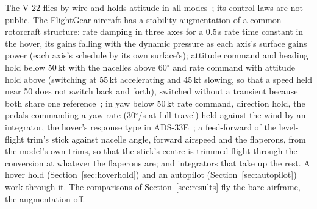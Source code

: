 \documentclass[10pt,a4paper,twocolumn]{article}
\begin{document}
The V-22 flies by wire and holds attitude in all modes~\cite{pd}; its control laws are not public. The FlightGear aircraft has a
stability augmentation of a common rotorcraft structure: rate damping in three axes for a 0.5\,s rate time constant in the hover,
its gains falling with the dynamic pressure as each axis's surface gains power (each axis's schedule by its own surface's);
attitude command and heading hold below 50\,kt with the nacelles above 60$^\circ$ and rate command with attitude hold above (switching at
55\,kt accelerating and 45\,kt slowing, so that a speed held near 50 does not switch back and forth), switched without a
transient because both share one reference~\cite{patent}; in yaw below 50\,kt rate command, direction hold, the pedals commanding a yaw rate
(30$^\circ$/s at full travel) held against the wind by an integrator, the hover's response type in ADS-33E~\cite{ads33}; a feed-forward of
the level-flight trim's stick against nacelle angle, forward airspeed and the flaperons, from the model's own trims, so that the stick's
centre is trimmed flight through the conversion at whatever the flaperons are; and integrators that take up the rest. A hover hold (Section~\ref{sec:hoverhold}) and an autopilot
(Section~\ref{sec:autopilot}) work through it.
The comparisons of Section~\ref{sec:results} fly the bare airframe, the augmentation off.
\end{document}
